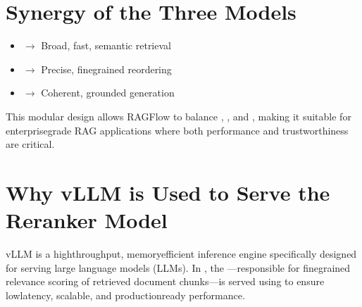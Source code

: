 \documentclass[letterpaper,10pt,english]{sphinxmanual}
\begin{document}
\chapter{Synergy of the Three Models}
\label{\detokenize{rerank:synergy-of-the-three-models}}\begin{itemize}
\item {} 
\sphinxAtStartPar
{} \(\rightarrow\) Broad, fast, semantic retrieval

\item {} 
\sphinxAtStartPar
{} \(\rightarrow\) Precise, fine\sphinxhyphen{}grained reordering

\item {} 
\sphinxAtStartPar
{} \(\rightarrow\) Coherent, grounded generation

\end{itemize}

\sphinxAtStartPar
This modular design allows RAGFlow to balance , , and , making it suitable for enterprise\sphinxhyphen{}grade RAG applications where both performance and trustworthiness are critical.

\sphinxstepscope


\chapter{Why vLLM is Used to Serve the Reranker Model}
\label{\detokenize{vllm:why-vllm-is-used-to-serve-the-reranker-model}}\label{\detokenize{vllm:vllm-reranker}}\label{\detokenize{vllm::doc}}
\sphinxAtStartPar
vLLM is a high\sphinxhyphen{}throughput, memory\sphinxhyphen{}efficient inference engine specifically designed for serving large language models (LLMs). In , the —responsible for fine\sphinxhyphen{}grained relevance scoring of retrieved document chunks—is served using  to ensure low\sphinxhyphen{}latency, scalable, and production\sphinxhyphen{}ready performance.
\end{document}
